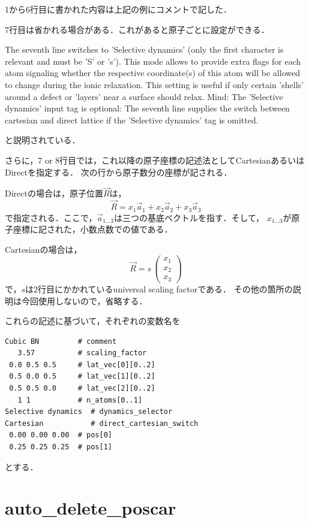 1から6行目に書かれた内容は上記の例にコメントで記した．

7行目は省かれる場合がある．これがあると原子ごとに設定ができる．

The seventh line switches to 'Selective dynamics' (only the first
character is relevant and must be 'S' or 's'). This mode allows to
provide extra flags for each atom signaling whether the respective
coordinate(s) of this atom will be allowed to change during the ionic
relaxation. This setting is useful if only certain 'shells' around a
defect or 'layers' near a surface should relax. Mind: The 'Selective
dynamics' input tag is optional: The seventh line supplies the switch
between cartesian and direct lattice if the 'Selective dynamics' tag is
omitted.

と説明されている．

さらに，7 or
8行目では，これ以降の原子座標の記述法としてCartesianあるいはDirectを指定する．
次の行から原子数分の座標が記される．

Directの場合は，原子位置\(\overrightarrow{R}\)は， \[
\overrightarrow{R} = x_1 \overrightarrow{a}_1 +
x_2 \overrightarrow{a}_2 +
x_3 \overrightarrow{a}_3
\]
で指定される．ここで，\(\overrightarrow{a}_{1 \dots 3}\)は三つの基底ベクトルを指す．そして，
\(x_{1 \dots 3}\)が原子座標に記された，小数点数での値である．

Cartesianの場合は， \[
\overrightarrow{R} = s \,
\left(\begin{array}{cc}
x_1\\
x_2\\
x_3
\end{array}\right)
\] で，\(s\)は2行目にかかれているuniversal scaling factorである．
その他の箇所の説明は今回使用しないので，省略する．

これらの記述に基づいて，それぞれの変数名を

\begin{verbatim}
Cubic BN         # comment
   3.57          # scaling_factor
 0.0 0.5 0.5     # lat_vec[0][0..2]
 0.5 0.0 0.5     # lat_vec[1][0..2]
 0.5 0.5 0.0     # lat_vec[2][0..2]
   1 1           # n_atoms[0..1]
Selective dynamics  # dynamics_selector
Cartesian           # direct_cartesian_switch
 0.00 0.00 0.00  # pos[0]
 0.25 0.25 0.25  # pos[1]
\end{verbatim}

とする．

    \section{auto\_delete\_poscar}\label{auto_delete_poscar}

